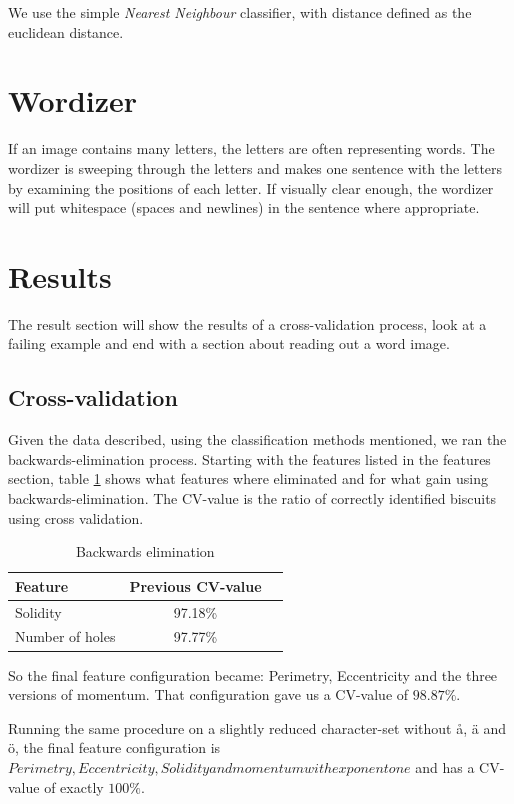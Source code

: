 \documentclass[a4paper,11pt]{article}
\begin{document}
We use the simple \emph{Nearest Neighbour} classifier, with distance defined as the euclidean distance.

\section{Wordizer}
If an image contains many letters, the letters are often representing words.
The wordizer is sweeping through the letters and makes one sentence with the letters by examining the positions of each letter.
If visually clear enough, the wordizer will put whitespace (spaces and newlines) in the sentence where appropriate.
\section{Results}
The result section will show the results of a cross-validation process, look at a failing example and end with a section about reading out a word image.
\subsection{Cross-validation}
Given the data described, using the classification methods mentioned, we ran the backwards-elimination process.
Starting with the features listed in the features section, table \ref{tab:backelim} shows what features
where eliminated and for what gain using backwards-elimination.
The CV-value is the ratio of correctly identified biscuits using cross validation.


\begin{table}[h!b!p!]
\caption{Backwards elimination}
\begin{center}
    \begin{tabular}{ l | c | c | }
    Feature         & Previous CV-value \\ \hline
    Solidity        & 97.18\%           \\ \hline
    Number of holes & 97.77\%           \\ \hline
    \end{tabular}
\end{center}
\label{tab:backelim}
\end{table}

So the final feature configuration became: Perimetry, Eccentricity and the three versions of momentum.
That configuration gave us a CV-value of $98.87\%$.

Running the same procedure on a slightly reduced character-set without å, ä and ö,
the final feature configuration is $ Perimetry, Eccentricity, Solidity  and momentum with exponent one$ and has a CV-value of exactly $100\%$. 
\end{document}

